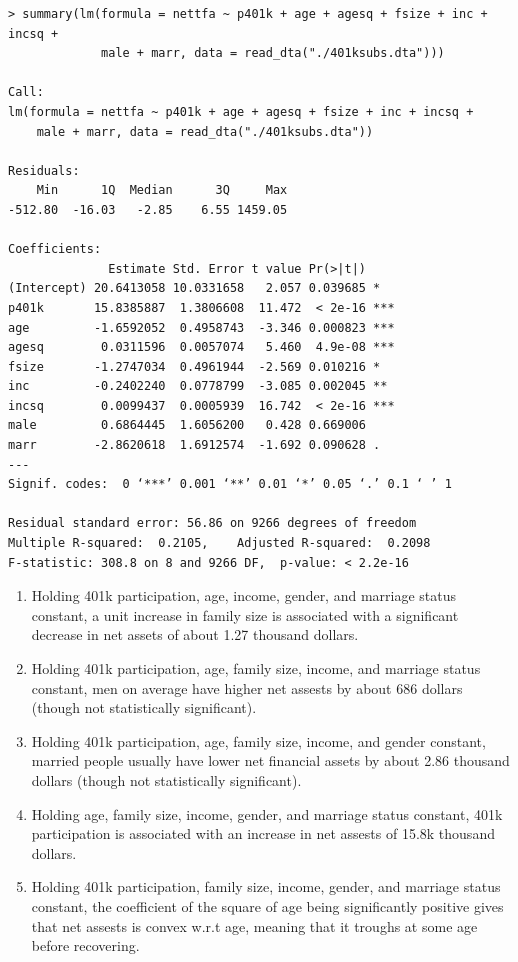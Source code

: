 \documentclass[12pt,letterpaper]{article}
\theoremstyle{definition}
\begin{document}
\begin{Verbatim}[fontsize=\small]
> summary(lm(formula = nettfa ~ p401k + age + agesq + fsize + inc + incsq +
             male + marr, data = read_dta("./401ksubs.dta")))

Call:
lm(formula = nettfa ~ p401k + age + agesq + fsize + inc + incsq +
    male + marr, data = read_dta("./401ksubs.dta"))

Residuals:
    Min      1Q  Median      3Q     Max
-512.80  -16.03   -2.85    6.55 1459.05

Coefficients:
              Estimate Std. Error t value Pr(>|t|)
(Intercept) 20.6413058 10.0331658   2.057 0.039685 *
p401k       15.8385887  1.3806608  11.472  < 2e-16 ***
age         -1.6592052  0.4958743  -3.346 0.000823 ***
agesq        0.0311596  0.0057074   5.460  4.9e-08 ***
fsize       -1.2747034  0.4961944  -2.569 0.010216 *
inc         -0.2402240  0.0778799  -3.085 0.002045 **
incsq        0.0099437  0.0005939  16.742  < 2e-16 ***
male         0.6864445  1.6056200   0.428 0.669006
marr        -2.8620618  1.6912574  -1.692 0.090628 .
---
Signif. codes:  0 ‘***’ 0.001 ‘**’ 0.01 ‘*’ 0.05 ‘.’ 0.1 ‘ ’ 1

Residual standard error: 56.86 on 9266 degrees of freedom
Multiple R-squared:  0.2105,	Adjusted R-squared:  0.2098
F-statistic: 308.8 on 8 and 9266 DF,  p-value: < 2.2e-16
\end{Verbatim}

\begin{enumerate}
  \item Holding 401k participation, age, income, gender, and marriage status constant, a unit increase in family size is associated with a significant decrease in net assets of about 1.27 thousand dollars.
  \item Holding 401k participation, age, family size, income, and marriage status constant, men on average have higher net assests by about 686 dollars (though not statistically significant).
  \item Holding 401k participation, age, family size, income, and gender constant, married people usually have lower net financial assets by about 2.86 thousand dollars (though not statistically significant).
  \item Holding age, family size, income, gender, and marriage status constant, 401k participation is associated with an increase in net assests of 15.8k thousand dollars.
  \item Holding 401k participation, family size, income, gender, and marriage status constant, the coefficient of the square of age being significantly positive gives that net assests is convex w.r.t age, meaning that it troughs at some age before recovering.
\end{enumerate}
\end{document}
